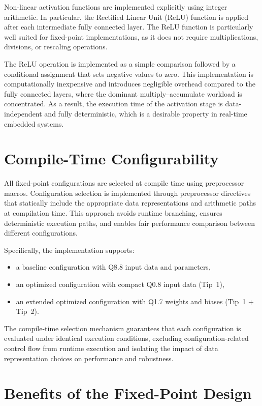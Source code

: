 Non-linear activation functions are implemented explicitly using integer
arithmetic.
In particular, the Rectified Linear Unit (ReLU) function is applied after each
intermediate fully connected layer.
The ReLU function is particularly well suited for fixed-point implementations,
as it does not require multiplications, divisions, or rescaling operations.

The ReLU operation is implemented as a simple comparison followed by a conditional
assignment that sets negative values to zero.
This implementation is computationally inexpensive and introduces negligible
overhead compared to the fully connected layers, where the dominant
multiply--accumulate workload is concentrated.
As a result, the execution time of the activation stage is data-independent and
fully deterministic, which is a desirable property in real-time embedded systems.


\section{Compile-Time Configurability}

All fixed-point configurations are selected at compile time using preprocessor
macros.
Configuration selection is implemented through preprocessor directives that
statically include the appropriate data representations and arithmetic paths
at compilation time.
This approach avoids runtime branching, ensures deterministic execution paths,
and enables fair performance comparison between different configurations.

Specifically, the implementation supports:
\begin{itemize}
    \item a baseline configuration with Q8.8 input data and parameters,
    \item an optimized configuration with compact Q0.8 input data (Tip~1),
    \item an extended optimized configuration with Q1.7 weights and biases
          (Tip~1 + Tip~2).
\end{itemize}

The compile-time selection mechanism guarantees that each configuration is
evaluated under identical execution conditions, excluding configuration-related
control flow from runtime execution and isolating the impact of data
representation choices on performance and robustness.


\section{Benefits of the Fixed-Point Design}

